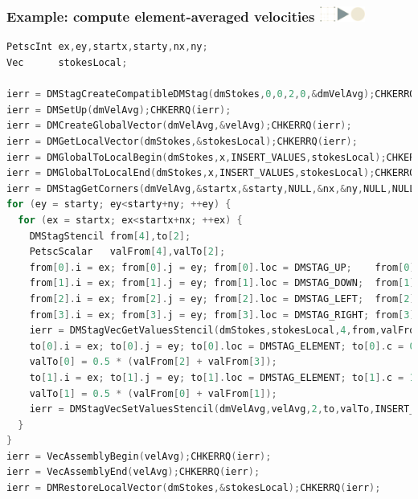 \documentclass{beamer}
\newcommand\frametitlelogo[1]{\frametitle{#1\hspace{0pt plus 1 filll} \includegraphics[width=42pt]{logo_slides}}}
\begin{document}
\begin{frame}[fragile]
\frametitlelogo{Example: compute element-averaged velocities}
\begin{lstlisting}[language=C,basicstyle=\tiny\ttfamily]
PetscInt ex,ey,startx,starty,nx,ny;
Vec      stokesLocal;

ierr = DMStagCreateCompatibleDMStag(dmStokes,0,0,2,0,&dmVelAvg);CHKERRQ(ierr);
ierr = DMSetUp(dmVelAvg);CHKERRQ(ierr);
ierr = DMCreateGlobalVector(dmVelAvg,&velAvg);CHKERRQ(ierr);
ierr = DMGetLocalVector(dmStokes,&stokesLocal);CHKERRQ(ierr);
ierr = DMGlobalToLocalBegin(dmStokes,x,INSERT_VALUES,stokesLocal);CHKERRQ(ierr);
ierr = DMGlobalToLocalEnd(dmStokes,x,INSERT_VALUES,stokesLocal);CHKERRQ(ierr);
ierr = DMStagGetCorners(dmVelAvg,&startx,&starty,NULL,&nx,&ny,NULL,NULL,NULL,NULL);CHKERRQ(ierr);
for (ey = starty; ey<starty+ny; ++ey) {
  for (ex = startx; ex<startx+nx; ++ex) {
    DMStagStencil from[4],to[2];
    PetscScalar   valFrom[4],valTo[2];
    from[0].i = ex; from[0].j = ey; from[0].loc = DMSTAG_UP;    from[0].c = 0;
    from[1].i = ex; from[1].j = ey; from[1].loc = DMSTAG_DOWN;  from[1].c = 0;
    from[2].i = ex; from[2].j = ey; from[2].loc = DMSTAG_LEFT;  from[2].c = 0;
    from[3].i = ex; from[3].j = ey; from[3].loc = DMSTAG_RIGHT; from[3].c = 0;
    ierr = DMStagVecGetValuesStencil(dmStokes,stokesLocal,4,from,valFrom);CHKERRQ(ierr);
    to[0].i = ex; to[0].j = ey; to[0].loc = DMSTAG_ELEMENT; to[0].c = 0;
    valTo[0] = 0.5 * (valFrom[2] + valFrom[3]);
    to[1].i = ex; to[1].j = ey; to[1].loc = DMSTAG_ELEMENT; to[1].c = 1;
    valTo[1] = 0.5 * (valFrom[0] + valFrom[1]);
    ierr = DMStagVecSetValuesStencil(dmVelAvg,velAvg,2,to,valTo,INSERT_VALUES);CHKERRQ(ierr);
  }
}
ierr = VecAssemblyBegin(velAvg);CHKERRQ(ierr);
ierr = VecAssemblyEnd(velAvg);CHKERRQ(ierr);
ierr = DMRestoreLocalVector(dmStokes,&stokesLocal);CHKERRQ(ierr);
\end{lstlisting}
\end{frame}
\end{document}
